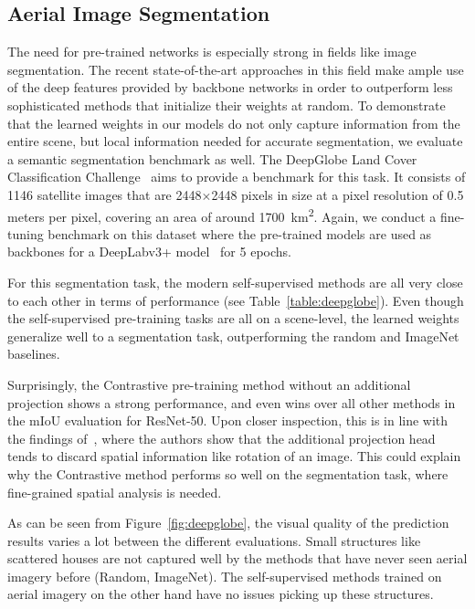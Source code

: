 \documentclass[journal]{IEEEtran}
\begin{document}
\subsection{Aerial Image Segmentation}
The need for pre-trained networks is especially
strong in fields like image segmentation.
The recent state-of-the-art approaches in this field make ample
use of the deep features provided by backbone networks
in order to outperform less sophisticated methods that initialize
their weights at random.
To demonstrate that the learned weights in our models do not only capture
information from the entire scene,
but local information needed for accurate segmentation,
we evaluate a semantic segmentation benchmark as well.
The DeepGlobe Land Cover Classification Challenge~\cite{deepglobe}
aims to provide a benchmark for this task.
It consists of 1146 satellite images that are 2448$\times$2448
pixels in size at a pixel resolution of 0.5 meters per pixel,
covering an area of around \SI{1700}{\square\km}.
Again, we conduct a fine-tuning benchmark on this dataset
where the pre-trained models are used as backbones for
a DeepLabv3+ model~\cite{ferrari_encoder-decoder_2018}
for 5 epochs.

For this segmentation task, the modern self-supervised methods
are all very close to each other
in terms of performance (see Table~\ref{table:deepglobe}).
Even though the self-supervised pre-training tasks are all
on a scene-level,
the learned weights generalize well to a segmentation task,
outperforming the random and ImageNet baselines.

Surprisingly, the Contrastive pre-training method without an additional
projection shows a strong performance,
and even wins over all other methods in the mIoU evaluation for ResNet-50.
Upon closer inspection, this is in line with the findings of~\cite{simclr},
where the authors show that the additional projection head tends to
discard spatial information like rotation of an image.
This could explain why the Contrastive method performs so well
on the segmentation task, 
where fine-grained spatial analysis is needed.

As can be seen from Figure~\ref{fig:deepglobe},
the visual quality of the prediction results varies a lot
between the different evaluations.
Small structures like scattered houses
are not captured well by the methods that have never seen
aerial imagery before (Random, ImageNet).
The self-supervised methods trained on aerial imagery
on the other hand have no issues picking up these structures.
\end{document}
